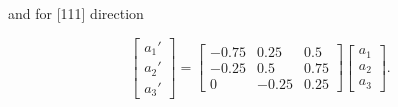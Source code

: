 and for [111] direction

\begin{equation}
\label{Eq:app_111_final}
\begin{bmatrix}
a_1' \\ a_2' \\ a_3'
\end{bmatrix}=
\begin{bmatrix}
-0.75 & 0.25 & 0.5 \\
-0.25 & 0.5 & 0.75 \\
0 & -0.25 & 0.25
\end{bmatrix}
\begin{bmatrix}
a_1 \\ a_2 \\ a_3
\end{bmatrix}.
\end{equation}

\ornament